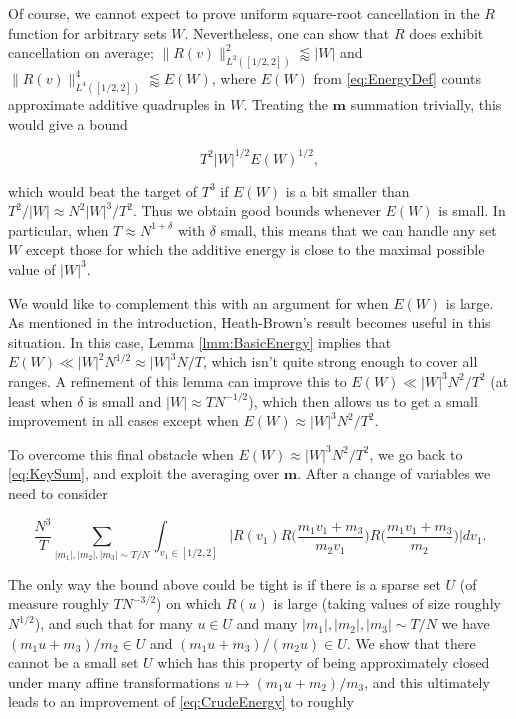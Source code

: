 \documentclass{amsart}
\theoremstyle{plain}
\numberwithin{equation}{section}
\begin{document}
Of course, we cannot expect to prove uniform square-root cancellation in the $R$ function for arbitrary sets $W$. Nevertheless, one can show that $R$ does exhibit cancellation on average; $\|R(v)\|_{L^2([1/2,2])}^2\lessapprox |W|$ and $\|R(v)\|_{L^4([1/2,2])}^4\lessapprox E(W)$, where $E(W)$ from \eqref{eq:EnergyDef} counts approximate additive quadruples in $W$. Treating the $\mathbf{m}$ summation trivially, this would give a bound

\begin{equation}
T^2|W|^{1/2}E(W)^{1/2},
\label{eq:CrudeEnergy}
\end{equation}

which would beat the target of $T^3$ if $E(W)$ is a bit smaller than $T^2/|W|\approx N^2 |W|^3/T^2$. Thus we obtain good bounds whenever $E(W)$ is small. In particular, when $T\approx N^{1+\delta}$ with $\delta$ small, this means that we can handle any set $W$ except those for which the additive energy is close to the maximal possible value of $|W|^3$.

We would like to complement this with an argument for when $E(W)$ is large. As mentioned in the introduction, Heath-Brown's result becomes useful in this situation. In this case, Lemma \ref{lmm:BasicEnergy} implies that $E(W)\ll |W|^2N^{1/2}\approx |W|^3N/T$, which isn't quite strong enough to cover all ranges. A refinement of this lemma can improve this to $E(W)\ll |W|^3N^2/T^2$ (at least when $\delta$ is small and $|W|\approx TN^{-1/2}$), which then allows us to get a small improvement in all cases except when $E(W)\approx |W|^3N^2/T^2$.

To overcome this final obstacle when $E(W)\approx |W|^3N^2/T^2$, we go back to \eqref{eq:KeySum}, and exploit the averaging over $\mathbf{m}$. After a change of variables we need to consider

\[
\frac{N^3}{T} \sum_{|m_1|,|m_2|,|m_3|\sim T/N}\int_{v_1 \in [1/2,2]}  \Big| R ( v_1 )  R \Big( \frac{ m_1 v_1 + m_3}{m_2 v_1} \Big)  R \Big( \frac{m_1 v_1 + m_3}{m_2} \Big) \Big| dv_1.
\]

The only way the bound above could be tight is if there is a sparse set $U$ (of measure roughly $TN^{-3/2}$) on which $R(u)$ is large (taking values of size roughly $N^{1/2}$), and such that for many $u\in U$ and many $|m_1|,|m_2|,|m_3|\sim T/N$ we have $(m_1u+m_3)/m_2\in U$ and  $(m_1u+m_3)/(m_2u)\in U$. We show that there cannot be a small set $U$ which has this property of being approximately closed under many affine transformations $u\mapsto (m_1u+m_2)/m_3$, and this ultimately leads to an improvement of \eqref{eq:CrudeEnergy} to roughly
\end{document}
